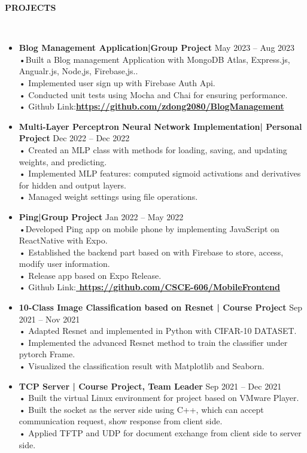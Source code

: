 \documentclass[a4paper,10pt]{article}
\newcommand{\lsep}{-0.5cm}
\newcommand{\resheading}[1]{{\small \colorbox{mygrey}{\begin{minipage}{0.975\textwidth}{\textbf{#1 \vphantom{p\^{E}}}}\end{minipage}}}}
\begin{document}
\resheading{\textbf{PROJECTS} }\\[\lsep]
\begin{itemize}
\setlength\itemsep{0em}

\item \textbf{Blog Management Application\!|Group Project} \hfill May 2023 – Aug 2023 \\
•Built a Blog management Application with MongoDB Atlas, Express.js, Angualr.js, Node,js, Firebase,js..\\
• Implemented user sign up with Firebase Auth Api.\\
• Conducted unit tests using Mocha and Chai for ensuring performance.\\
• Github Link:\textbf{\url{https://github.com/zdong2080/BlogManagement}}

\item \textbf{ Multi-Layer Perceptron Neural Network Implementation| Personal Project} \hfill Dec 2022 – Dec 2022\\
• Created an MLP class with methods for loading, saving, and updating weights, and predicting.\\
• Implemented MLP features: computed sigmoid activations and derivatives for hidden and output layers.\\
• Managed weight settings using file operations.

\item \textbf{Ping\!|Group Project} \hfill Jan 2022 – May 2022 \\
•Developed Ping app on mobile phone by implementing JavaScript on ReactNative with Expo.\\
• Established the backend part based on with Firebase to store, access, modify user information.\\
• Release app based on Expo Release.\\
• Github Link:\textbf{\url{ https://github.com/CSCE-606/MobileFrontend}}

\item \textbf{10-Class Image Classification based on Resnet | Course Project} \hfill Sep 2021 – Nov 2021\\
• Adapted Resnet and implemented in Python with CIFAR-10 DATASET.\\
• Implemented the advanced Resnet method to train the classifier under pytorch Frame.\\
• Visualized the classification result with Matplotlib and Seaborn.

\item \textbf{TCP Server | Course Project, Team Leader} \hfill Sep 2021 – Dec 2021\\
• Built the virtual Linux environment for project based on VMware Player.\\
• Built the socket as the server side using C++, which can accept communication request, show response
from client side.\\
• Applied TFTP and UDP for document exchange from client side to server side.


\end{itemize}
\end{document}
